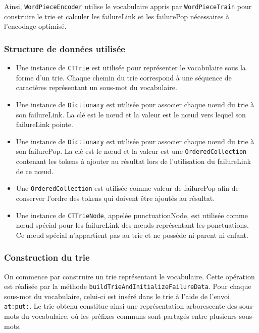 \documentclass[12pt,a4paper]{report}
\begin{document}
	Ainsi, \texttt{WordPieceEncoder} utilise le vocabulaire appris par \texttt{WordPieceTrain} pour construire le trie et calculer les failureLink et les failurePop nécessaires à l’encodage optimisé.
	
	\subsubsection{Structure de données utilisée}
	
	\begin{itemize}
		\item Une instance de \texttt{CTTrie} est utilisée pour représenter le vocabulaire sous la forme d’un trie. Chaque chemin du trie correspond à une séquence de caractères représentant un sous-mot du vocabulaire.
		
		\item Une instance de \texttt{Dictionary} est utilisée pour associer chaque nœud du trie à son failureLink. La clé est le nœud et la valeur est le nœud vers lequel son failureLink pointe.
		
		\item Une instance de \texttt{Dictionary} est utilisée pour associer chaque nœud du trie à son failurePop. La clé est le nœud et la valeur est une \texttt{OrderedCollection} contenant les tokens à ajouter au résultat lors de l'utilisation du failureLink de ce nœud.
		
		\item Une \texttt{OrderedCollection} est utilisée comme valeur de failurePop afin de conserver l’ordre des tokens qui doivent être ajoutés au résultat.
		
		\item Une instance de \texttt{CTTrieNode}, appelée punctuationNode, est utilisée comme nœud spécial pour les failureLink des nœuds représentant les ponctuations. Ce nœud spécial n’appartient pas au trie et ne possède ni parent ni enfant.
	\end{itemize}
	
	\subsubsection{Construction du trie}
	
	On commence par construire un trie représentant le vocabulaire. Cette opération est réalisée par la méthode \texttt{buildTrieAndInitializeFailureData}. Pour chaque sous-mot du vocabulaire, celui-ci est inséré dans le trie à l'aide de l'envoi \texttt{at:put:}. Le trie obtenu constitue ainsi une représentation arborescente des sous-mots du vocabulaire, où les préfixes communs sont partagés entre plusieurs sous-mots.
	
\end{document}
